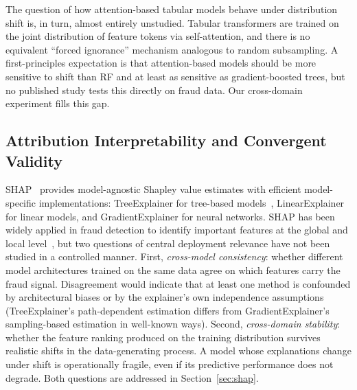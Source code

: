 \documentclass[a4paper,fleqn]{cas-sc}
\begin{document}
The question of how attention-based tabular models behave under distribution
shift is, in turn, almost entirely unstudied.
Tabular transformers are trained on the joint distribution of feature tokens
via self-attention, and there is no equivalent ``forced ignorance'' mechanism
analogous to random subsampling.
A first-principles expectation is that attention-based models should be more
sensitive to shift than RF and at least as sensitive as gradient-boosted trees,
but no published study tests this directly on fraud data.
Our cross-domain experiment fills this gap.

\subsection{Attribution Interpretability and Convergent Validity}
\label{sec:rw_interp}

SHAP~\citep{lundberg2017unified} provides model-agnostic Shapley value
estimates with efficient model-specific implementations: TreeExplainer for
tree-based models~\citep{lundberg2020local}, LinearExplainer for linear models,
and GradientExplainer for neural networks.
SHAP has been widely applied in fraud detection to identify important features
at the global and local level~\citep{hilal2022financial,nesvijevskaia2021accuracy},
but two questions of central deployment relevance have not been studied in a
controlled manner.
First, \emph{cross-model consistency}: whether different model architectures
trained on the same data agree on which features carry the fraud signal.
Disagreement would indicate that at least one method is confounded by
architectural biases or by the explainer's own independence assumptions
(TreeExplainer's path-dependent estimation differs from GradientExplainer's
sampling-based estimation in well-known ways).
Second, \emph{cross-domain stability}: whether the feature ranking produced
on the training distribution survives realistic shifts in the data-generating
process.
A model whose explanations change under shift is operationally fragile, even
if its predictive performance does not degrade.
Both questions are addressed in Section~\ref{sec:shap}.
\end{document}
